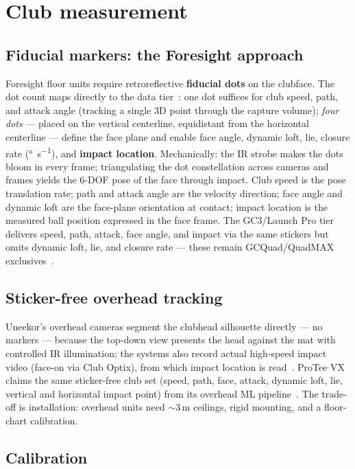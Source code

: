 \section{Club measurement}
\label{sec:camclub}

\subsection{Fiducial markers: the Foresight approach}

Foresight floor units require retroreflective \textbf{fiducial dots} on
the clubface. The dot count maps directly to the data
tier~\cite{foresighthmt,foresightmarkers}: one dot suffices for club
speed, path, and attack angle (tracking a single 3D point through the
capture volume); \emph{four dots} --- placed on the vertical centerline,
equidistant from the horizontal centerline --- define the face plane and
enable face angle, dynamic loft, lie, closure rate
(\si{\degree\per\second}), and \textbf{impact location}. Mechanically: the
IR strobe makes the dots bloom in every frame; triangulating the dot
constellation across cameras and frames yields the 6-DOF pose of the face
through impact. Club speed is the pose translation rate; path and attack
angle are the velocity direction; face angle and dynamic loft are the
face-plane orientation at contact; impact location is the measured ball
position expressed in the face frame. The GC3/Launch Pro tier delivers
speed, path, attack, face angle, and impact via the same stickers but
omits dynamic loft, lie, and closure rate --- these remain
GCQuad/QuadMAX exclusives~\cite{playbetterblp}.

\subsection{Sticker-free overhead tracking}

Uneekor's overhead cameras segment the clubhead silhouette directly ---
no markers --- because the top-down view presents the head against the mat
with controlled IR illumination; the systems also record actual
high-speed impact video (face-on via Club Optix), from which impact
location is read~\cite{uneekoreyexo}. ProTee VX claims the same
sticker-free club set (speed, path, face, attack, dynamic loft, lie,
vertical and horizontal impact point) from its overhead ML
pipeline~\cite{proteevx}. The trade-off is installation: overhead units
need $\sim$3\,m ceilings, rigid mounting, and a floor-chart calibration.

\subsection{Calibration}

